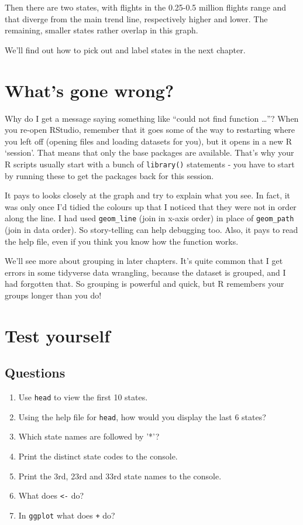 \documentclass[
]{book}
\providecommand{\tightlist}{%
  \setlength{\itemsep}{0pt}\setlength{\parskip}{0pt}}
\begin{document}
Then there are two states, with flights in the 0.25-0.5 million flights range and that diverge from the main trend line, respectively higher and lower. The remaining, smaller states rather overlap in this graph.

We'll find out how to pick out and label states in the next chapter.

\hypertarget{whats-gone-wrong-2}{%
\section{What's gone wrong?}\label{whats-gone-wrong-2}}

Why do I get a message saying something like ``could not find function \ldots{}''? When you re-open RStudio, remember that it goes some of the way to restarting where you left off (opening files and loading datasets for you), but it opens in a new R `session'. That means that only the base packages are available. That's why your R scripts usually start with a bunch of \texttt{library()} statements - you have to start by running these to get the packages back for this session.

It pays to looks closely at the graph and try to explain what you see. In fact, it was only once I'd tidied the colours up that I noticed that they were not in order along the line. I had used \texttt{geom\_line} (join in x-axis order) in place of \texttt{geom\_path} (join in data order). So story-telling can help debugging too. Also, it pays to read the help file, even if you think you know how the function works.

We'll see more about grouping in later chapters. It's quite common that I get errors in some tidyverse data wrangling, because the dataset is grouped, and I had forgotten that. So grouping is powerful and quick, but R remembers your groups longer than you do!

\hypertarget{test-yourself-1}{%
\section{Test yourself}\label{test-yourself-1}}

\hypertarget{questions-1}{%
\subsection{Questions}\label{questions-1}}

\begin{enumerate}
\def\labelenumi{\arabic{enumi})}
\tightlist
\item
  Use \texttt{head} to view the first 10 states.
\item
  Using the help file for \texttt{head}, how would you display the last 6 states?
\item
  Which state names are followed by '*'?
\item
  Print the distinct state codes to the console.
\item
  Print the 3rd, 23rd and 33rd state names to the console.
\item
  What does \texttt{\textless{}-} do?
\item
  In \texttt{ggplot} what does \texttt{+} do?
\end{enumerate}
\end{document}
